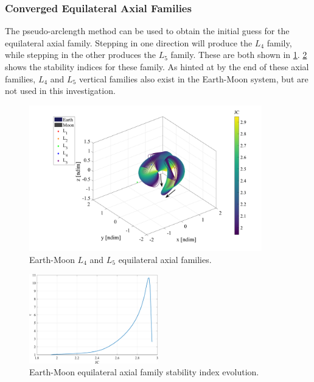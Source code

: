 \subsubsection{Converged Equilateral Axial Families}
The pseudo-arclength method can be used to obtain the initial guess for the equilateral axial
family. Stepping in one direction will produce the $L_{4}$ family, while stepping in the other
produces the $L_{5}$ family. These are both shown in \cref{fig:eqAxial}.
\cref{fig:eqAxialStability} shows the stability indices for these family. As hinted at by the end
of these axial families, $L_{4}$ and $L_{5}$ vertical families also exist in the Earth-Moon system,
but are not used in this investigation.

\begin{figure}[ht]
    \centering
    \includegraphics[width=0.9\textwidth]{figures/EquilateralAxialFamily.pdf}
    \caption{Earth-Moon $L_{4}$ and $L_{5}$ equilateral axial families.}
    \label{fig:eqAxial}
\end{figure}

\begin{figure}[ht]
    \centering
    \includegraphics[width=0.5\textwidth]{figures/EquilateralAxialStability.pdf}
    \caption{Earth-Moon equilateral axial family stability index evolution.}
    \label{fig:eqAxialStability}
\end{figure}

